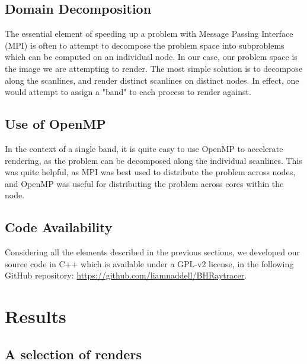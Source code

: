 \subsection{Domain Decomposition}

The essential element of speeding up a problem with Message Passing Interface (MPI) \cite{mpi41} is often to attempt to decompose the problem space into subproblems which can be computed on an individual node. In our case, our problem space is the image we are attempting to render. The most simple solution is to decompose along the scanlines, and render distinct scanlines on distinct nodes. In effect, one would attempt to assign a "band" to each process to render against.

\subsection{Use of OpenMP}
In the context of a single band, it is quite easy to use OpenMP \cite{660313_OMP} to accelerate rendering, as the problem can be decomposed along the individual scanlines. This was quite helpful, as MPI was best used to distribute the problem across nodes, and OpenMP was useful for distributing the problem across cores within the node.

\subsection{Code Availability}
Considering all the elements described in the previous sections, we developed our
source code in C++ which is available under a GPL-v2 license, in the following
GitHub repository:
	\url{https://github.com/liamnaddell/BHRaytracer}.



\section{Results}
\label{sec:results}

\subsection{A selection of renders}

